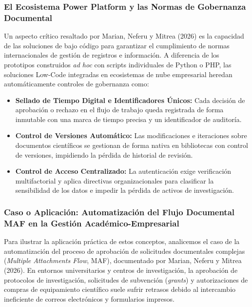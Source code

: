 \subsubsection{El Ecosistema Power Platform y las Normas de Gobernanza Documental}

Un aspecto crítico resaltado por Marian, Neferu y Mitrea (2026) es la capacidad de las soluciones de bajo código para garantizar el cumplimiento de normas internacionales de gestión de registros e información. A diferencia de los prototipos construidos \textit{ad hoc} con scripts individuales de Python o PHP, las soluciones Low-Code integradas en ecosistemas de nube empresarial heredan automáticamente controles de gobernanza como:

\begin{itemize}
    \item \textbf{Sellado de Tiempo Digital e Identificadores Únicos:} Cada decisión de aprobación o rechazo en el flujo de trabajo queda registrada de forma inmutable con una marca de tiempo precisa y un identificador de auditoría.
    \item \textbf{Control de Versiones Automático:} Las modificaciones e iteraciones sobre documentos científicos se gestionan de forma nativa en bibliotecas con control de versiones, impidiendo la pérdida de historial de revisión.
    \item \textbf{Control de Acceso Centralizado:} La autenticación exige verificación multifactorial y aplica directivas organizacionales para clasificar la sensibilidad de los datos e impedir la pérdida de activos de investigación.
\end{itemize}

\subsubsection{Caso o Aplicación: Automatización del Flujo Documental MAF en la Gestión Académico-Empresarial}

Para ilustrar la aplicación práctica de estos conceptos, analicemos el caso de la automatización del proceso de aprobación de solicitudes documentales complejas (\textit{Multiple Attachments Flow}, MAF), documentado por Marian, Neferu y Mitrea (2026). En entornos universitarios y centros de investigación, la aprobación de protocolos de investigación, solicitudes de subvención (\textit{grants}) y autorizaciones de compras de equipamiento científico suele sufrir retrasos debido al intercambio ineficiente de correos electrónicos y formularios impresos.

